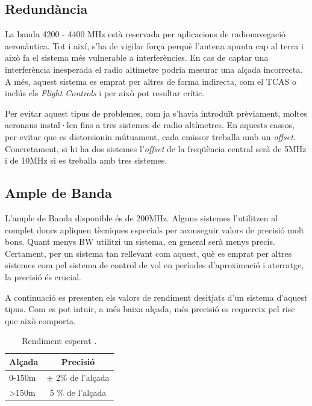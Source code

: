 \subsection{Redundància}
La banda 4200 - 4400 MHz està reservada per aplicacions de radionavegació aeronàutica. Tot i així, s'ha de vigilar força perquè l'antena apunta cap al terra i això fa el sistema més vulnerable a interferències. En cas de captar una interferència inesperada el radio altímetre podria mesurar una alçada incorrecta. A més, aquest sistema es emprat per altres de forma indirecta, com el TCAS o inclús els \textit{Flight Controls} i per això pot resultar crític.

Per evitar aquest tipus de problemes, com ja s'havia introduït prèviament, moltes aeronaus instal·len fins a tres sistemes de radio altímetres. En aquests cassos, per evitar que es distorsionin mútuament, cada emissor treballa amb un \textit{offset}. Concretament, si hi ha dos sistemes l'\textit{offset} de la freqüència central serà de 5MHz i de 10MHz si es treballa amb tres sistemes.

\subsection{Ample de Banda}
L'ample de Banda disponible és de 200MHz. Alguns sistemes l'utilitzen al complet doncs apliquen tècniques especials per aconseguir valors de precisió molt bons. Quant menys BW utilitzi un sistema, en general serà menys precís. Certament, per un sistema tan rellevant com aquest, què es emprat per altres sistemes com pel sistema de control de vol en períodes d'aproximació i aterratge, la precisió és crucial.

A continuació es presenten els valors de rendiment desitjats d'un sistema d'aquest tipus. Com es pot intuir, a més baixa alçada, més precisió es requereix pel risc que això comporta.
\begin{table}[H]
	\centering
	\begin{tabular}{lc}
		\toprule[3pt]
		\textbf{Alçada}&\textbf{Precisió}\\
		\midrule[1pt]
		0-150m & $\pm$ 2\% de l'alçada \\
		>150m & 5 \% de l'alçada \\
		\bottomrule[2pt]
	\end{tabular}
	\label{C}
	\caption{Rendiment esperat \cite{Kellermann2001}.}
\end{table}
